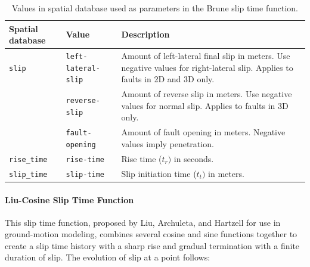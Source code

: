 \noindent \begin{center}
\begin{table}[H]
\noindent \centering{}\caption{\label{tab:Brune-slip-db-params}Values in spatial database used as
parameters in the Brune slip time function.}
\medskip{}
\begin{tabular}{|l|l|>{\raggedright}p{2.5in}|}
\hline 
\textbf{Spatial database} & \textbf{Value} & \textbf{Description}\tabularnewline
\hline 
\hline 
\texttt{slip} & \texttt{left-lateral-slip} & Amount of left-lateral final slip in meters. Use negative values for
right-lateral slip. Applies to faults in 2D and 3D only.\tabularnewline
 & \texttt{reverse-slip} & Amount of reverse slip in meters. Use negative values for normal slip.
Applies to faults in 3D only.\tabularnewline
 & \texttt{fault-opening} & Amount of fault opening in meters. Negative values imply penetration.\tabularnewline
\hline 
\texttt{rise\_time} & \texttt{rise-time} & Rise time ($t_{r})$ in seconds.\tabularnewline
\hline 
\texttt{slip\_time} & \texttt{slip-time} & Slip initiation time ($t_{t})$ in meters.\tabularnewline
\hline 
\end{tabular}
\end{table}

\par\end{center}


\paragraph{Liu-Cosine Slip Time Function}

This slip time function, proposed by Liu, Archuleta, and Hartzell
for use in ground-motion modeling\cite{Liu:etal:2006}, combines several
cosine and sine functions together to create a slip time history with
a sharp rise and gradual termination with a finite duration of slip.
The evolution of slip at a point follows: 

